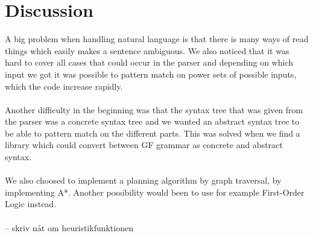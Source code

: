 \section{Discussion}
A big problem when handling natural language is that there is many ways of read things which easily makes a sentence ambiguous. We also noticed that it was hard to cover all cases that could occur in the parser and depending on which input we got it was possible to pattern match on power sets of possible inputs, which the code increase rapidly. \\\\
Another difficulty in the beginning was that the syntax tree that was given from the parser was a concrete syntax tree and we wanted an abstract syntax tree to be able to pattern match on the different parts. This was solved when we find a library which could convert between GF grammar as concrete and abstract syntax. \\\\
We also choosed to implement a planning algorithm by graph traversal, by implementing A*. Another possibility would been to use for example First-Order Logic instead. 
\\\\
-- skriv nåt om heuristikfunktionen

